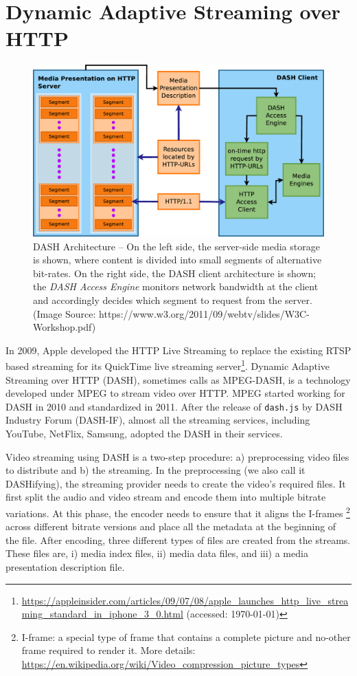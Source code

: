 \section{Dynamic Adaptive Streaming over HTTP}
\begin{figure}[!t]
	\centering
	\includegraphics[scale=0.15]{img/dash-arch}
	\caption{\small{DASH Architecture -- On the left side, the server-side media storage is shown, where content is divided into small segments of alternative bit-rates. On the right side, the DASH client architecture is shown; the {\it DASH Access Engine} monitors network bandwidth at the client and accordingly decides which segment to request from the server. (Image Source: https://www.w3.org/2011/09/webtv/slides/W3C-Workshop.pdf)}}
	\label{fig:dash}
\end{figure}
In 2009, Apple developed the HTTP Live Streaming to replace the existing RTSP based streaming for its QuickTime live streaming server\footnote{\url{https://appleinsider.com/articles/09/07/08/apple_launches_http_live_streaming_standard_in_iphone_3_0.html} (accessed: \today)}. Dynamic Adaptive Streaming over HTTP (DASH), sometimes calls as MPEG-DASH, is a technology developed under MPEG to stream video over HTTP. MPEG started working for DASH in 2010 and standardized in 2011\cite{ISO/IEC23009-1:2019}. After the release of {\tt dash.js} by DASH Industry Forum (DASH-IF), almost all the streaming services, including YouTube, NetFlix, Samsung, adopted the DASH in their services.

Video streaming using DASH is a two-step procedure: a) preprocessing video files to distribute and b) the streaming. In the preprocessing (we also call it DASHifying), the streaming provider needs to create the video's required files. It first split the audio and video stream and encode them into multiple bitrate variations. At this phase, the encoder needs to ensure that it aligns the I-frames \footnote{I-frame: a special type of frame that contains a complete picture and no-other frame required to render it. More details: \url{https://en.wikipedia.org/wiki/Video_compression_picture_types}} across different bitrate versions and place all the metadata at the beginning of the file. After encoding, three different types of files are created from the streams. These files are, i) media index files, ii) media data files, and iii) a media presentation description file.

